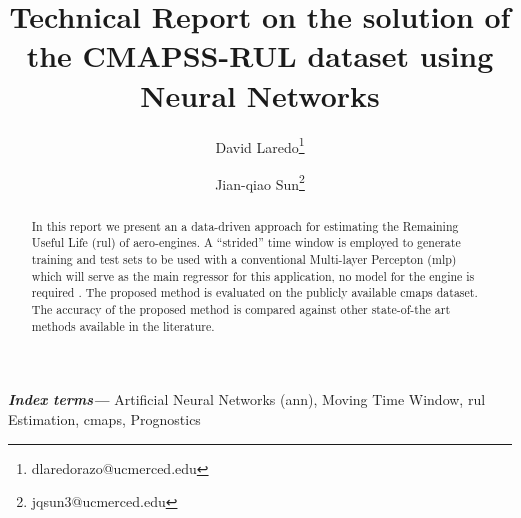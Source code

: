 \documentclass{article}
\title{Technical Report on the solution of the CMAPSS-RUL dataset using Neural Networks}
\author[1]{David Laredo\thanks{dlaredorazo@ucmerced.edu}}
\author[1]{Jian-qiao Sun\thanks{jqsun3@ucmerced.edu}}
\affil[1]{School of Mechanical Engineering, University of California, Merced}
\date{}
\providecommand{\keywords}[1]{\textbf{\textit{Index terms---}} #1}
\begin{document}
\maketitle %

\thispagestyle{fancy} %


\glsunsetall


\begin{abstract}

\noindent 

In this report we present an a data-driven approach for estimating the Remaining Useful Life (\gls{rul}) of aero-engines. A ``strided'' time window is employed to generate training and test sets to be used with a conventional Multi-layer Percepton (\gls{mlp}) which will serve as the main regressor for this application, no model for the engine is required . The proposed method is evaluated on the publicly available \gls{cmaps} dataset. The accuracy of the proposed method is compared against other state-of-the art methods available in the literature. 
\end{abstract}

\keywords{Artificial Neural Networks (\gls{ann}), Moving Time Window, \gls{rul} Estimation, \gls{cmaps}, Prognostics}






%







\end{document}

